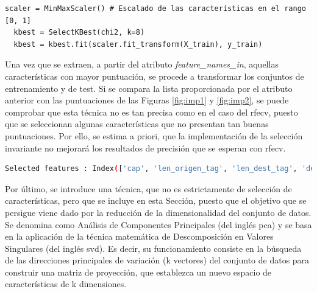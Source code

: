 \vspace{3mm}

\begin{lstlisting}[style=Python, caption={Aplicación del \textit{kBest}}]
  scaler = MinMaxScaler() # Escalado de las características en el rango [0, 1]
  kbest = SelectKBest(chi2, k=8)
  kbest = kbest.fit(scaler.fit_transform(X_train), y_train)
\end{lstlisting}

\vspace{3mm}

Una vez que se extraen, a partir del atributo \textit{feature\_names\_in}, aquellas características con mayor puntuación, se procede a transformar los conjuntos de entrenamiento y de test. Si se compara la lista proporcionada por el atributo anterior con las puntuaciones de las Figuras \ref{fig:imp1} y \ref{fig:imp2}, se puede comprobar que esta técnica no es tan precisa como en el caso del \gls{rfecv}, puesto que se seleccionan algunas características que no presentan tan buenas puntuaciones. Por ello, se estima a priori, que la implementación de la selección invariante no mejorará los resultados de precisión que se esperan con \gls{rfecv}.

\vspace{3mm}

\begin{lstlisting}[language=bash, style=Python, caption={Resultados del \textit{kBest} para \textit{k=8}}]
  Selected features : Index(['cap', 'len_origen_tag', 'len_dest_tag', 'degree', 'abs_flux', 'Beam Irradiance (W/m2)', 'Plane of Array Irradiance (W/m2)', 'Cell Temperature (C)'], dtype='object')       
\end{lstlisting}

\vspace{3mm}

Por último, se introduce una técnica, que no es estrictamente de selección de características, pero que se incluye en esta Sección, puesto que el objetivo que se persigue viene dado por la reducción de la dimensionalidad del conjunto de datos. Se denomina como Análisis de Componentes Principales (del inglés \gls{pca}) \cite{pca} y se basa en la aplicación de la técnica matemática de Descomposición en Valores Singulares (del inglés \gls{svd}). Es decir, su funcionamiento consiste en la búsqueda de las direcciones principales de variación (k vectores) del conjunto de datos para construir una matriz de proyección, que establezca un nuevo espacio de características de k dimensiones.

